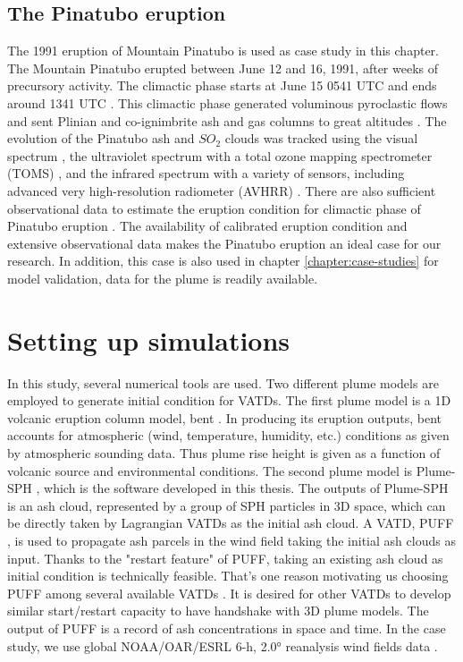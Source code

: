 \subsection{The Pinatubo eruption}

The 1991 eruption of Mountain Pinatubo is used as case study in this chapter. The Mountain Pinatubo erupted between June 12 and 16, 1991, after weeks of precursory activity. The climactic phase starts at June 15 0541 UTC and ends around 1341 UTC \citep{holasek1996satellite}. This climactic phase generated voluminous pyroclastic flows and sent Plinian and co-ignimbrite ash and gas columns to great altitudes \citep{scott1996pyroclastic}. The evolution of the Pinatubo ash and $SO_2$ clouds was tracked using the visual spectrum \citep{holasek1996satellite}, the ultraviolet spectrum with a total ozone mapping spectrometer (TOMS) \citep{guo2004re}, and the infrared spectrum with a variety of sensors, including advanced very high-resolution radiometer (AVHRR) \citep{guo2004particles}. There are also sufficient observational data to estimate the eruption condition for climactic phase of Pinatubo eruption \citep{suzuki2009three}. The availability of calibrated eruption condition and extensive observational data makes the Pinatubo eruption an ideal case for our research. In addition, this case is also used in chapter \ref{chapter:case-studies} for model validation, data for the plume is readily available.

\section{Setting up simulations} \label{sec:Methodology}

In this study, several numerical tools are used. Two different plume models are employed to generate initial condition for VATDs.
The first plume model is a 1D volcanic eruption column model, bent \citep{bursik2001effect}. In producing its eruption outputs, bent accounts for atmospheric (wind, temperature, humidity, etc.) conditions as given by atmospheric sounding data. Thus plume rise height is given as a function of volcanic source and environmental conditions. The second plume model is Plume-SPH \citep{gmd-2017-119}, which is the software developed in this thesis. The outputs of Plume-SPH is an ash cloud, represented by a group of SPH particles in 3D space, which can be directly taken by Lagrangian VATDs as the initial ash cloud. A VATD, PUFF \citep{tanaka1991development,searcy1998puff}, is used to propagate ash parcels in the wind field taking the initial ash clouds as input. Thanks to the "restart feature" of PUFF, taking an existing ash cloud as initial condition is technically feasible. That's one reason motivating us choosing PUFF among several available VATDs \citep[e.g.][]{searcy1998puff,schwaiger2012ash3d}. It is desired for other VATDs to develop similar start/restart capacity to have handshake with 3D plume models. The output of PUFF is a record of ash concentrations in space and time. In the case study, we use global NOAA/OAR/ESRL 6-h, 2.0° reanalysis wind fields data \citep{whitaker2004reanalysis, compo2006feasibility, compo2011twentieth}.

